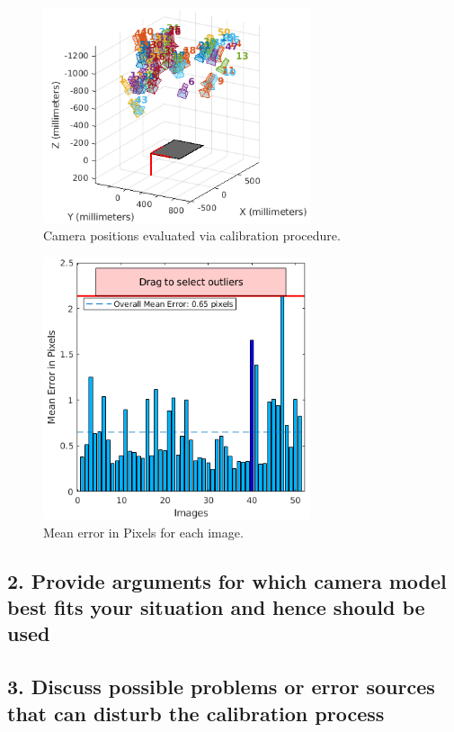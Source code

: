 \begin{figure}[H]
\begin{center}
\includegraphics[width=0.7\textwidth]{graphics/camera_positions.png}
\caption{Camera positions evaluated via calibration procedure.}
\label{fig:poses}
\end{center}
\end{figure}

\begin{figure}[H]
\begin{center}
\includegraphics[width=0.7\textwidth]{graphics/stats.png}
\caption{Mean error in Pixels for each image.}
\label{fig:stats}
\end{center}
\end{figure}
\subsection*{2. Provide arguments for which camera model best fits your situation and hence should be used}

\subsection*{3. Discuss possible problems or error sources that can disturb the calibration process}
